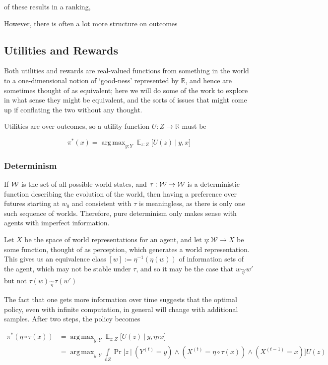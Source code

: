 \documentclass{book}
\DeclareMathOperator*{\argmax}{arg\,max}
\DeclareMathOperator*{\E}{\mathbb E}
\begin{document}
	of these results in a ranking, 
	
	However, there is often a lot more structure on outcomes
	
	
	

	
	\subsection{Utilities and Rewards}
	
	Both utilities and rewards are real-valued functions from something in the world to a one-dimensional notion of `good-ness' represented by $\mathbb R$, and hence are sometimes thought of as equivalent; here we will do some of the work to explore in what sense they might be equivalent, and the sorts of issues that might come up if conflating the two without any thought.
	
	Utilities are over outcomes, so a utility function $U : Z \to \mathbb R$ must be
	
	\[ \pi^*(x) = \argmax_{y: Y} \E_{z : Z} \Big[ U(z)~\Big|~ y,x\Big] \]
	
	\subsubsection{Determinism}
	If $\cal W$ is the set of all possible world states, and $\tau: \cal W \to W$ is a deterministic function describing the evolution of the world, then having a preference over futures starting at $w_0$ and consistent with $\tau$ is meaningless, as there is only one such sequence of worlds. Therefore, pure determinism only makes sense with agents with imperfect information. 
	
	Let $X$ be the space of world representations for an agent, and let $\eta: \mathcal W \to X$ be some function, thought of as perception, which generates a world representation. This gives us an equivalence class $[w] := \eta^{-1}(\eta(w))$ of information sets of the agent, which may not be stable under $\tau$, and so it may be the case that $w \underset\eta\sim w'$ but not $\tau(w) \underset\eta\sim \tau(w')$
	
	
	
	The fact that one gets more information over time suggests that the optimal policy, even with infinite computation, in general will change with additional samples. After two steps, the policy becomes
	
	\begin{align*}
		\pi^*(\eta\circ\tau (x)) &= \argmax_{y: Y} \E_{z : Z} \Big[ U(z)~\Big|~ y,\eta\tau x \Big]  \\
			&= \argmax_{y: Y} \int\limits_{\mathrm dZ} \Pr\Big[z~\Big|~\left(Y^{(t)} = y \right) \land \left(X^{(t)}= \eta \circ \tau (x)\right) \land \left(X^{(t-1)} = x \right) \Big] U(z)
	\end{align*}
		
\end{document}
